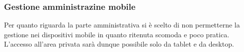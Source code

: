 \subsubsection{Gestione amministrazine mobile}
Per quanto riguarda la parte amministrativa si \`e scelto di non permetterne la gestione nei dispositivi mobile in quanto ritenuta scomoda e poco pratica. \\
 L'accesso all'area privata sar\`a dunque possibile solo da tablet e da desktop.
